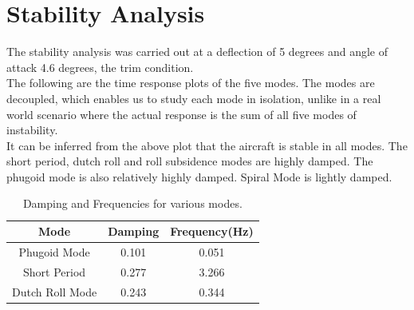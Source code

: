 \section{Stability Analysis}
The stability analysis was carried out at a deflection of 5 degrees and angle of attack 4.6 degrees, the trim condition.\\
The following are the time response plots of the five modes. The modes are decoupled, which enables us to study each mode in isolation, unlike in a real world scenario where the actual response is the sum of all five modes of instability.\\
It can be inferred from the above plot that the aircraft is stable in all modes. The short period, dutch roll and roll subsidence modes are highly damped. The phugoid mode is also relatively highly damped. Spiral Mode is lightly damped.\\

\begin{table}[H]
\begin{center}
\begin{tabular}{ |c| c| c| }
\hline
 Mode & Damping & Frequency(Hz) \\ 
 \hline
 Phugoid Mode & 0.101 & 0.051 \\ 
 \hline
 Short Period & 0.277 & 3.266 \\ 
 \hline
 Dutch Roll Mode & 0.243 & 0.344 \\
 \hline
\end{tabular}
\end{center}
\caption{Damping and Frequencies for various modes.}
\end{table}
